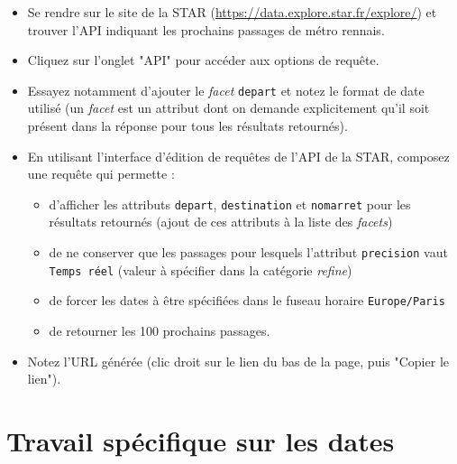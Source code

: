 \documentclass[11pt,a4paper]{article}
\begin{document}
\begin{itemize}
    \item Se rendre sur le site de la STAR (\url{https://data.explore.star.fr/explore/})
            et trouver l'API indiquant les prochains passages de métro rennais.
    \item Cliquez sur l'onglet "API" pour accéder aux options de requête.
    \item Essayez notamment d'ajouter le \emph{facet} \verb+depart+ et notez le format de date
            utilisé (un \emph{facet} est un attribut dont on demande explicitement qu'il soit 
            présent dans la réponse pour tous les résultats retournés).
    \item En utilisant l'interface d'édition de requêtes de l'API de la STAR, composez une requête qui permette :
    \begin{itemize}
        \item d'afficher les attributs \verb+depart+, \verb+destination+ et \verb+nomarret+ pour les résultats 
            retournés (ajout de ces attributs à la liste des \emph{facets})
        \item de ne conserver que les passages pour lesquels l'attribut \verb+precision+ vaut 
        \verb+Temps réel+ (valeur à spécifier dans la catégorie \emph{refine})
        \item de forcer les dates à être spécifiées dans le fuseau horaire \verb+Europe/Paris+
        \item de retourner les 100 prochains passages.
    \end{itemize}
    \item Notez l'URL générée (clic droit sur le lien du bas de la page, puis "Copier le lien").
\end{itemize}

\section{Travail spécifique sur les dates}
\end{document}
